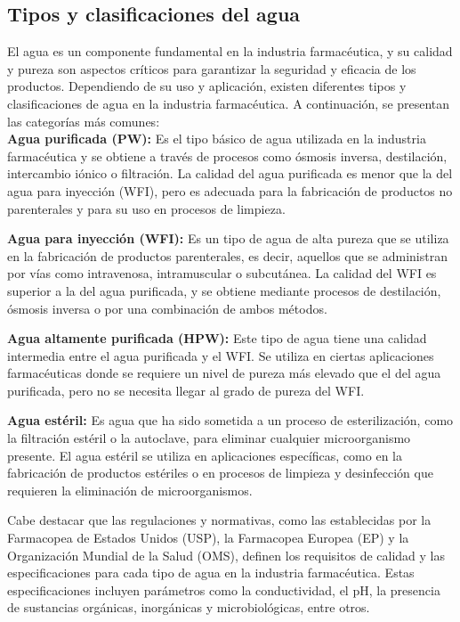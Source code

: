 \subsection{Tipos y clasificaciones del agua}

El agua es un componente fundamental en la industria farmacéutica, y su calidad y pureza son aspectos críticos para garantizar la seguridad y eficacia de los productos. Dependiendo de su uso y aplicación, existen diferentes tipos y clasificaciones de agua en la industria farmacéutica. A continuación, se presentan las categorías más comunes:\\

\textbf{Agua purificada (PW):} Es el tipo básico de agua utilizada en la industria farmacéutica y se obtiene a través de procesos como ósmosis inversa, destilación, intercambio iónico o filtración. La calidad del agua purificada es menor que la del agua para inyección (WFI), pero es adecuada para la fabricación de productos no parenterales y para su uso en procesos de limpieza.

\textbf{Agua para inyección (WFI):} Es un tipo de agua de alta pureza que se utiliza en la fabricación de productos parenterales, es decir, aquellos que se administran por vías como intravenosa, intramuscular o subcutánea. La calidad del WFI es superior a la del agua purificada, y se obtiene mediante procesos de destilación, ósmosis inversa o por una combinación de ambos métodos.

\textbf{Agua altamente purificada (HPW):} Este tipo de agua tiene una calidad intermedia entre el agua purificada y el WFI. Se utiliza en ciertas aplicaciones farmacéuticas donde se requiere un nivel de pureza más elevado que el del agua purificada, pero no se necesita llegar al grado de pureza del WFI.

\textbf{Agua estéril:} Es agua que ha sido sometida a un proceso de esterilización, como la filtración estéril o la autoclave, para eliminar cualquier microorganismo presente. El agua estéril se utiliza en aplicaciones específicas, como en la fabricación de productos estériles o en procesos de limpieza y desinfección que requieren la eliminación de microorganismos.

Cabe destacar que las regulaciones y normativas, como las establecidas por la Farmacopea de Estados Unidos (USP), la Farmacopea Europea (EP) y la Organización Mundial de la Salud (OMS), definen los requisitos de calidad y las especificaciones para cada tipo de agua en la industria farmacéutica. Estas especificaciones incluyen parámetros como la conductividad, el pH, la presencia de sustancias orgánicas, inorgánicas y microbiológicas, entre otros.
